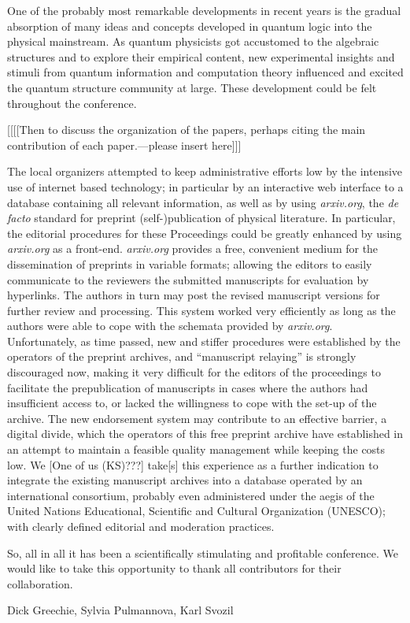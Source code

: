 \documentclass{article}
\begin{document}
One of the probably most remarkable developments in recent years
is the gradual absorption of many ideas and concepts developed in quantum logic
into the physical mainstream.
As quantum physicists got accustomed to the algebraic structures and to explore their empirical content,
new experimental insights and stimuli from quantum information and computation theory
influenced and excited the quantum structure community at large.
These development could be felt throughout the conference.


[[[[Then to discuss the organization of the papers, perhaps citing the main contribution of  each paper.---please insert here]]]


The local organizers attempted to keep administrative efforts low
by the intensive use of internet based technology;
in particular by an interactive web interface
to a database containing all relevant information,
as well as by using {\em arxiv.org},
the {\em de facto} standard for preprint (self-)publication of physical literature.
In particular, the editorial procedures for these Proceedings could be greatly enhanced by using
{\em arxiv.org} as a front-end.
{\em arxiv.org} provides a free, convenient medium for the dissemination of preprints in variable formats;
allowing the editors to easily communicate to the reviewers
the submitted manuscripts for evaluation by hyperlinks.
The authors in turn may post the revised manuscript versions for further review and processing.
This system worked very efficiently as long as the authors were able to cope with the schemata
provided by {\em arxiv.org}.
Unfortunately,
as time passed, new and stiffer procedures were established by the operators of the preprint archives,
and ``manuscript relaying'' is strongly discouraged now, making it very difficult for the editors
of the proceedings to facilitate the prepublication of manuscripts in cases where
the authors had insufficient access to, or lacked the willingness to cope with the
set-up of the archive.
The new endorsement system may contribute to an effective barrier, a digital divide,
which the operators of this free preprint archive have established in an attempt to
maintain a feasible quality management while keeping the costs low.
We [One of us (KS)???]
take[s] this experience as a further indication to integrate the existing manuscript archives
into a database operated by an international consortium, probably even administered under
the aegis of the United Nations Educational, Scientific and Cultural Organization (UNESCO);
with clearly defined editorial and moderation practices.

So, all in all it has been a scientifically stimulating and profitable conference.
We would like to take this opportunity to thank all contributors for their collaboration.

Dick Greechie,
Sylvia Pulmannova,
Karl Svozil
\end{document}
